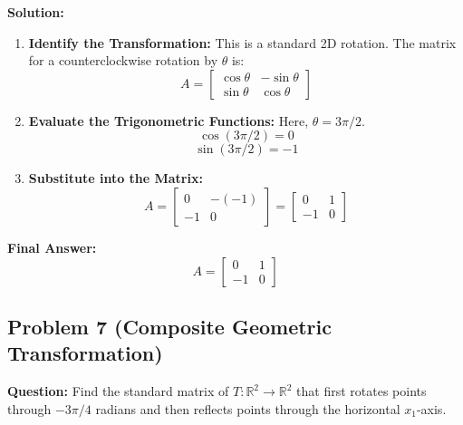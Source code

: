 \documentclass[11pt]{article}
\begin{document}
\textbf{Solution:}
\begin{enumerate}
    \item \textbf{Identify the Transformation:} This is a standard 2D rotation. The matrix for a counterclockwise rotation by $\theta$ is:
    \[ A = \begin{bmatrix} \cos\theta & -\sin\theta \\ \sin\theta & \cos\theta \end{bmatrix} \]
    \item \textbf{Evaluate the Trigonometric Functions:} Here, $\theta = 3\pi/2$. 
    \[ \cos(3\pi/2) = 0 \]
    \[ \sin(3\pi/2) = -1 \]
    \item \textbf{Substitute into the Matrix:}
    \[ A = \begin{bmatrix} 0 & -(-1) \\ -1 & 0 \end{bmatrix} = \begin{bmatrix} 0 & 1 \\ -1 & 0 \end{bmatrix} \]
\end{enumerate}
\textbf{Final Answer:} \[ A = \begin{bmatrix} 0 & 1 \\ -1 & 0 \end{bmatrix} \]

\subsection*{Problem 7 (Composite Geometric Transformation)}
\textbf{Question:} Find the standard matrix of $T: \mathbb{R}^2 \to \mathbb{R}^2$ that first rotates points through $-3\pi/4$ radians and then reflects points through the horizontal $x_1$-axis.
\end{document}
